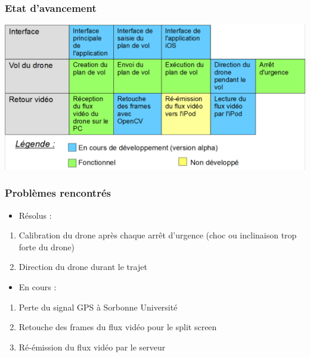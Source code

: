 \documentclass{beamer}
\begin{document}

	\begin{frame}
		\begin{center}
		\frametitle{Etat d'avancement}
         \includegraphics[scale=0.35]{Avancement_projet.PNG}
        \end{center}
	\end{frame}
	
	
	\begin{frame}
		\begin{center}
		\frametitle{Problèmes rencontrés}
	    \begin{itemize}
                 \item Résolus :
            \end{itemize}
        \begin{enumerate}
             
            \item Calibration du drone après chaque arrêt d'urgence (choc ou inclinaison trop forte du drone)
             \item Direction du drone durant le trajet
             \end{enumerate}
            \begin{itemize}
                \item En cours :
            \end{itemize}
            \begin{enumerate}
           \item Perte du signal GPS à Sorbonne Université
           \item Retouche des frames du flux vidéo pour le split screen
           \item Ré-émission du flux vidéo par le serveur
           \end{enumerate}
		\end{center}
	\end{frame}

	
\end{document}
